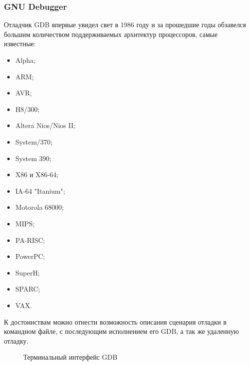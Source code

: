 \subsubsection{GNU Debugger}\label{sec:ch1/sec3/sub2/sub1}
Отладчик GDB впервые увидел свет в 1986 году и за прошедшие годы обзавелся
большим количеством поддерживаемых архитектур процессоров, самые известные:
\begin{itemize}
    \item Alpha;
    \item ARM;
    \item AVR;
    \item H8/300;
    \item Altera Nios/Nios II;
    \item System/370;
    \item System 390;
    \item X86 и X86-64;
    \item IA-64 "Itanium";
    \item Motorola 68000;
    \item MIPS;
    \item PA-RISC;
    \item PowerPC;
    \item SuperH;
    \item SPARC;
    \item VAX.
\end{itemize}
К достоинствам можно отнести возможность описания сценария отладки в командном файле,
с последующим исполнением его GDB, а так же удаленную отладку.
\begin{figure}[!htbp]
    \caption{Терминальный интерфейс GDB \label{fig:gdb-tui}}
\end{figure}

